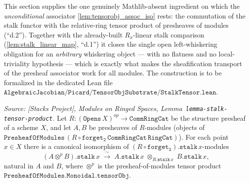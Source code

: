 This section supplies the one genuinely Mathlib-absent ingredient on which the
\emph{unconditional} associator \cref{lem:tensorobj_assoc_iso} rests: the commutation
of the stalk functor with the relative-ring tensor product of presheaves of modules
(``d.2''). Together with the already-built \(R_x\)-linear stalk comparison
(\cref{lem:stalk_linear_map}, ``d.1'') it closes the single open left-whiskering
obligation for an \emph{arbitrary} whiskering object --- with no flatness and no
local-triviality hypothesis --- which is exactly what makes the sheafification
transport of the presheaf associator work for all modules. The construction is to be
formalized in the dedicated Lean file
\(\mathtt{AlgebraicJacobian/Picard/TensorObjSubstrate/StalkTensor.lean}\).

\begin{lemma}

  \label{lem:stalk_tensor_commutation}
  \textit{Source: [Stacks Project], Modules on Ringed Spaces,
  Lemma~\texttt{lemma-stalk-tensor-product}.}
  Let \(R : (\mathtt{Opens}\,X)^{op} \to \mathtt{CommRingCat}\) be the structure
  presheaf of a scheme \(X\), and let \(A, B\) be presheaves of
  \(R\)-modules (objects of \(\mathtt{PresheafOfModules}\,(R \circ
  \mathtt{forget_2}\,\mathtt{CommRingCat}\,\mathtt{RingCat})\)). For each point
  \(x \in X\) there is a canonical isomorphism of \((R \circ
  \mathtt{forget_2}).\mathtt{stalk}\,x\)-modules
  \[
    (A \otimes^{p} B).\mathtt{stalk}\,x
      \;\xrightarrow{\ \sim\ }\;
    A.\mathtt{stalk}\,x \;\otimes_{R.\mathtt{stalk}\,x}\; B.\mathtt{stalk}\,x,
  \]
  natural in \(A\) and \(B\), where \(\otimes^{p}\) is the presheaf-of-modules tensor
  product \(\mathtt{PresheafOfModules.Monoidal.tensorObj}\).
\end{lemma}

